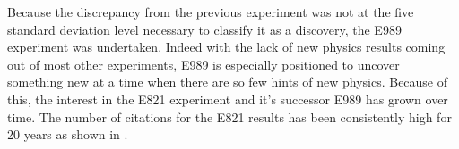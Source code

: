 



Because the discrepancy from the previous experiment was not at the five standard deviation level necessary to classify it as a discovery, the E989 experiment was undertaken. Indeed with the lack of new physics results coming out of most other experiments, E989 is especially positioned to uncover something new at a time when there are so few hints of new physics. Because of this, the interest in the E821 experiment and it's successor E989 has grown over time. The number of citations for the E821 results has been consistently high for 20 years as shown in .


